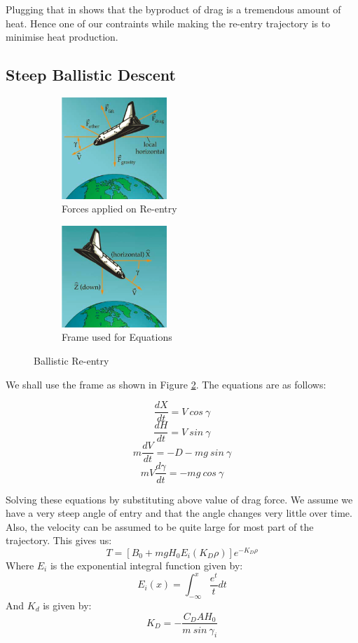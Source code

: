 \documentclass[12pt, letterpaper]{article}
\begin{document}
Plugging that in shows that the byproduct of drag is a tremendous amount of heat. Hence one of our contraints while making the re-entry trajectory is to minimise heat production. 

\subsection{Steep Ballistic Descent}

\begin{figure}[h!]
\centering
\begin{subfigure}{.5\textwidth}
  \centering
  \includegraphics[width=150px]{entryForces}
  \caption{Forces applied on Re-entry}
  \label{fig:forces}
\end{subfigure}%
\begin{subfigure}{.5\textwidth}
  \centering
  \includegraphics[width=150px]{entryFrame}
  \caption{Frame used for Equations}
  \label{fig:frame}
\end{subfigure}
\caption{Ballistic Re-entry}
\label{fig:entry}
\end{figure}

\newpage

We shall use the frame as shown in Figure \ref{fig:frame}. The equations are as follows:

\[
	\frac{dX}{dt} = V\: cos\:\gamma
\]
\[
	\frac{dH}{dt} = V \:sin\:\gamma
\]
\[
	m\frac{dV}{dt} = -D - mg \:sin\:\gamma
\]
\[
	mV\frac{d\gamma}{dt} = -mg\:cos\:\gamma
\]

Solving these equations by substituting above value of drag force. We assume we have a very steep angle of entry and that the angle changes very little over time. Also, the velocity can be assumed to be quite large for most part of the trajectory. This gives us:
\[
	T = \left[ B_0 + mgH_0 E_i(K_D \rho) \right]e ^{-K_D\rho}
\]
Where $E_i$ is the exponential integral function given by:
\[
	E_i(x) = \int_{-\infty}^{x} \frac{e^t}{t} dt
\]
And $K_d$ is given by:
\[
	K_D = -\frac{C_D A H_0}{m\: sin\: \gamma_i}
\]
\end{document}
